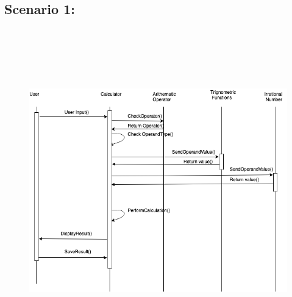 \documentclass[12pt]{report}
\begin{document}
\vspace{\baselineskip}
\subsection*{Scenario 1:}

\vspace{\baselineskip}



\begin{figure}[H]
	\begin{Center}
		\includegraphics[width=7.0in,height=5.52in]{./image8.png}
	\end{Center}
\end{figure}



\par


\vspace{\baselineskip}

\vspace{\baselineskip}

\vspace{\baselineskip}
\end{document}

